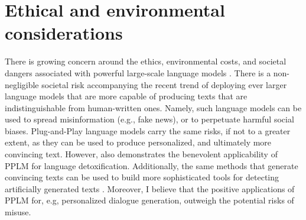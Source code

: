 \section{Ethical and environmental considerations}

There is growing concern around the ethics, environmental costs, and societal dangers associated with powerful large-scale language models \citep{brown2020language-models-few-shot-gpt3, bender2021dangers}. There is a non-negligible societal risk accompanying the recent trend of deploying ever larger language models that are more capable of producing texts that are indistinguishable from human-written ones. Namely, such language models can be used to spread misinformation (e.g., fake news), or to perpetuate harmful social biases. Plug-and-Play language models carry the same risks, if not to a greater extent, as they can be used to produce personalized, and ultimately more convincing text. However, \cite{dathathri2019plug} also demonstrates the benevolent applicability of PPLM for language detoxification. Additionally, the same methods that generate convincing texts can be used to build more sophisticated tools for detecting artificially generated texts \cite{gehrmann-etal-2019-gltr}. Moreover, I believe that the positive applications of PPLM for, e.g, personalized dialogue generation, outweigh the potential risks of misuse. 



